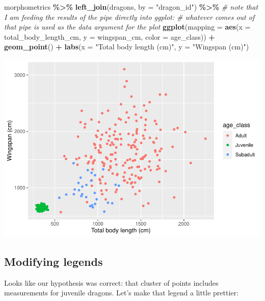 \documentclass[
]{book}
\newenvironment{Shaded}{\begin{snugshade}}{\end{snugshade}}
\newcommand{\AttributeTok}[1]{\textcolor[rgb]{0.13,0.29,0.53}{#1}}
\newcommand{\CommentTok}[1]{\textcolor[rgb]{0.56,0.35,0.01}{\textit{#1}}}
\newcommand{\FunctionTok}[1]{\textcolor[rgb]{0.13,0.29,0.53}{\textbf{#1}}}
\newcommand{\NormalTok}[1]{#1}
\newcommand{\SpecialCharTok}[1]{\textcolor[rgb]{0.81,0.36,0.00}{\textbf{#1}}}
\newcommand{\StringTok}[1]{\textcolor[rgb]{0.31,0.60,0.02}{#1}}
\begin{document}
\begin{Shaded}
\begin{Highlighting}[]
\NormalTok{morphometrics }\SpecialCharTok{\%\textgreater{}\%} 
  \FunctionTok{left\_join}\NormalTok{(dragons, }\AttributeTok{by =} \StringTok{"dragon\_id"}\NormalTok{) }\SpecialCharTok{\%\textgreater{}\%} 
  \CommentTok{\# note that I am feeding the results of the pipe directly into ggplot:}
  \CommentTok{\# whatever comes out of that pipe is used as the data argument for the plot}
\FunctionTok{ggplot}\NormalTok{(}\AttributeTok{mapping =} \FunctionTok{aes}\NormalTok{(}\AttributeTok{x =}\NormalTok{ total\_body\_length\_cm, }\AttributeTok{y =}\NormalTok{ wingspan\_cm, }\AttributeTok{color =}\NormalTok{ age\_class)) }\SpecialCharTok{+}
  \FunctionTok{geom\_point}\NormalTok{() }\SpecialCharTok{+}
  \FunctionTok{labs}\NormalTok{(}\AttributeTok{x =} \StringTok{"Total body length (cm)"}\NormalTok{, }\AttributeTok{y =} \StringTok{"Wingspan (cm)"}\NormalTok{)}
\end{Highlighting}
\end{Shaded}

\includegraphics{reproducible-science_files/figure-latex/gg8-1.pdf}

\hypertarget{modifying-legends}{%
\subsection{Modifying legends}\label{modifying-legends}}

Looks like our hypothesis was correct: that cluster of points includes
measurements for juvenile dragons. Let's make that legend a little prettier:
\end{document}
